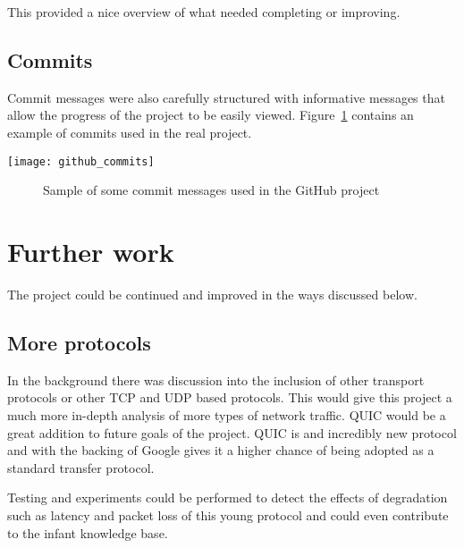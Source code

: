 This provided a nice overview of what needed completing or improving.

\subsection{Commits}
Commit messages were also carefully structured with informative messages that allow the progress of the project to be easily viewed. Figure~\ref{ref:githubCommits} contains an example of commits used in the real project.

\begin{center}
	\texttt{[image: github\_commits]}
	\begin{figure}[h]
		\caption{Sample of some commit messages used in the GitHub project}
		\label{ref:githubCommits}
	\end{figure}
\end{center}

\section{Further work}
The project could be continued and improved in the ways discussed below.

\subsection{More protocols}
In the background there was discussion into the inclusion of other transport protocols or other TCP and UDP based protocols. This would give this project a much more in-depth analysis of more types of network traffic. QUIC would be a great addition to future goals of the project. QUIC is and incredibly new protocol and with the backing of Google gives it a higher chance of being adopted as a standard transfer protocol.

Testing and experiments could be performed to detect the effects of degradation such as latency and packet loss of this young protocol and could even contribute to the infant knowledge base.


